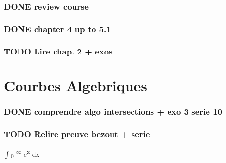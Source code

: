 \documentclass[11pt]{article}
\begin{document}
\subsubsection{{\bfseries\sffamily DONE} review course}
\label{sec:org99cabe6}
\subsubsection{{\bfseries\sffamily DONE} chapter 4 up to 5.1}
\label{sec:org47900e0}
\subsubsection{{\bfseries\sffamily TODO} Lire chap. 2 + exos}
\label{sec:org100db07}

\section{Courbes Algebriques}
\label{sec:orgc898b9b}
\subsubsection{{\bfseries\sffamily DONE} comprendre algo intersections + exo 3 serie 10}
\label{sec:org63c7d69}



\subsubsection{{\bfseries\sffamily TODO} Relire preuve bezout + serie}
\label{sec:orgfb9969d}

\(\int\)\textsubscript{0}\textsuperscript{ \(\infty\) }e\textsuperscript{x} dx
\end{document}
